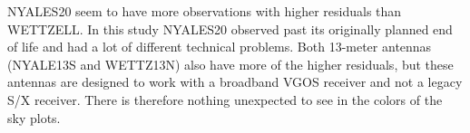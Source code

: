 \documentclass[twoside=semi,fontsize=12pt,paper=a4,titlepage=on]{kv_article}
\begin{document}

NYALES20 seem to have more observations with higher residuals than WETTZELL. In this study NYALES20 observed past its originally planned end of life and had a lot of different technical problems. Both 13-meter antennas (NYALE13S and WETTZ13N) also have more of the higher residuals, but these antennas are designed to work with a broadband VGOS receiver and not a legacy S/X receiver. There is therefore nothing unexpected to see in the colors of the sky plots.
\end{document}
